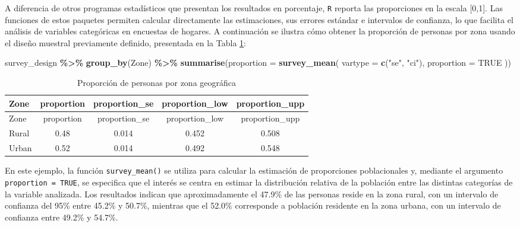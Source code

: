 \documentclass[
  spanish,
  12pt,
]{book}
\newenvironment{Shaded}{\begin{snugshade}}{\end{snugshade}}
\newcommand{\AttributeTok}[1]{\textcolor[rgb]{0.13,0.29,0.53}{#1}}
\newcommand{\ConstantTok}[1]{\textcolor[rgb]{0.56,0.35,0.01}{#1}}
\newcommand{\FunctionTok}[1]{\textcolor[rgb]{0.13,0.29,0.53}{\textbf{#1}}}
\newcommand{\NormalTok}[1]{#1}
\newcommand{\SpecialCharTok}[1]{\textcolor[rgb]{0.81,0.36,0.00}{\textbf{#1}}}
\newcommand{\StringTok}[1]{\textcolor[rgb]{0.31,0.60,0.02}{#1}}
\begin{document}
A diferencia de otros programas estadísticos que presentan los resultados en porcentaje, \texttt{R} reporta las proporciones en la escala {[}0,1{]}. Las funciones de estos paquetes permiten calcular directamente las estimaciones, sus errores estándar e intervalos de confianza, lo que facilita el análisis de variables categóricas en encuestas de hogares. A continuación se ilustra cómo obtener la proporción de personas por zona usando el diseño muestral previamente definido, presentada en la Tabla \ref{tab:tab-prop-zona}:

\begin{Shaded}
\begin{Highlighting}[]
\NormalTok{survey\_design }\SpecialCharTok{\%\textgreater{}\%}
  \FunctionTok{group\_by}\NormalTok{(Zone) }\SpecialCharTok{\%\textgreater{}\%}
  \FunctionTok{summarise}\NormalTok{(}\AttributeTok{proportion =} \FunctionTok{survey\_mean}\NormalTok{(}
    \AttributeTok{vartype =} \FunctionTok{c}\NormalTok{(}\StringTok{"se"}\NormalTok{, }\StringTok{"ci"}\NormalTok{),}
    \AttributeTok{proportion =} \ConstantTok{TRUE}
\NormalTok{  ))}
\end{Highlighting}
\end{Shaded}

\begin{longtable}[]{@{}lcccc@{}}
\caption{\label{tab:tab-prop-zona}Proporción de personas por zona geográfica}\tabularnewline
\toprule\noalign{}
Zone & proportion & proportion\_se & proportion\_low & proportion\_upp \\
\midrule\noalign{}
\endfirsthead
\toprule\noalign{}
Zone & proportion & proportion\_se & proportion\_low & proportion\_upp \\
\midrule\noalign{}
\endhead
\bottomrule\noalign{}
\endlastfoot
Rural & 0.48 & 0.014 & 0.452 & 0.508 \\
Urban & 0.52 & 0.014 & 0.492 & 0.548 \\
\end{longtable}

En este ejemplo, la función \texttt{survey\_mean()} se utiliza para calcular la estimación de proporciones poblacionales y, mediante el argumento \texttt{proportion\ =\ TRUE}, se especifica que el interés se centra en estimar la distribución relativa de la población entre las distintas categorías de la variable analizada. Los resultados indican que aproximadamente el 47.9\% de las personas reside en la zona rural, con un intervalo de confianza del 95\% entre 45.2\% y 50.7\%, mientras que el 52.0\% corresponde a población residente en la zona urbana, con un intervalo de confianza entre 49.2\% y 54.7\%.
\end{document}
